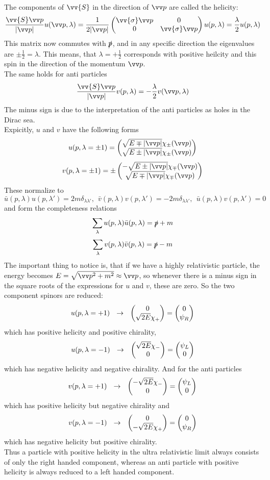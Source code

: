 The components of $\vv{S}$ in the direction of $\vp$ are called the helicity:
\[\frac{\vv{S}\vp}{|\vp|} u(\vp, \lambda) = \frac{1}{2|\vp|}\Matz{\vv{\sigma}\vp}{0}{0}{\vv{\sigma}\vp}u(p,\lambda) = \frac{\lambda}{2}u(p,\lambda)\]
This matrix now commutes with $\slashed{p}$, and in any specific direction the eigenvalues are $\pm \frac{1}{2} = \lambda$. This means, that $\lambda = + \frac{1}{2}$ corresponds with positive heilcity and this spin in the direction of the momentum $\vp$.\\
The same holds for anti particles
\[ \frac{ \vv{S}\vp }{ |\vp| } v(p,\lambda) = - \frac{\lambda}{2}v(\vp, \lambda)\]
The minus sign is due to the interpretation of the anti particles as holes in the Dirac sea.\\
Expicitly, $u$ and $v$ have the following forms
\[ u(p, \lambda = \pm 1) = \vektorz{ \sqrt{ E\mp |\vp|} \chi_\pm(\vp)}{\sqrt{E\pm|\vp|} \chi_\pm(\vp)}\]
\[ v(p, \lambda = \pm 1) = \pm\vektorz{-\sqrt{E\pm|\vp|} \chi_\mp(\vp)}{\sqrt{E\mp |\vp|}\chi_\mp(\vp)}\]
These normalize to
\[ \bar{u}(p, \lambda) u(p, \lambda') = 2m \delta_{\lambda\lambda'}, ~~\bar{v}(p, \lambda)v(p, \lambda') = - 2m \delta_{\lambda\lambda'}, ~~ \bar{u}(p, \lambda)v(p,\lambda') = 0\]
and form the completeness relations
\[ \sum_\lambda u(p,\lambda) \bar{u}(p,\lambda) = \slashed{p} + m\]
\[ \sum_\lambda v(p, \lambda) \bar{v}(p,\lambda) = \slashed{p} - m\]
The important thing to notice is, that if we have a highly relativistic particle, the energy becomes $E = \sqrt{\vp^2 + m^2} \approx \vp$, so whenever there is a minus sign in the square roots of the expressions for $u$ and $v$, these are zero. So the two component spinors are reduced:
\[ u(p, \lambda = +1) ~~\rightarrow~~ \begin{pmatrix} 0 \\ \sqrt{2E} \chi_+ \end{pmatrix} = \begin{pmatrix} 0 \\ \psi_R \end{pmatrix}\]
which has positive helicity and positive chirality,
\[ u(p, \lambda = -1) ~~\rightarrow~~ \begin{pmatrix} \sqrt{2E} \chi_- \\ 0 \end{pmatrix} = \begin{pmatrix} \psi_L \\ 0 \end{pmatrix}\]
which has negative helicity and negative chirality. And for the anti particles
\[v(p, \lambda = +1) ~~\rightarrow~~\begin{pmatrix} -\sqrt{2E}\chi_- \\ 0 \end{pmatrix} = \begin{pmatrix} \psi_L \\ 0 \end{pmatrix}\]
which has positive helicity but negative chirality and
\[v(p, \lambda = -1) ~~\rightarrow~~\begin{pmatrix} 0 \\ - \sqrt{2E} \chi_+ \end{pmatrix} = \begin{pmatrix} 0 \\ \psi_R \end{pmatrix}\]
which has negative helicity but positive chirality.\\
Thus a particle with positive helicity in the ultra relativistic limit always consists of only the right handed component, whereas an anti particle with positive helicity is always reduced to a left handed component.

